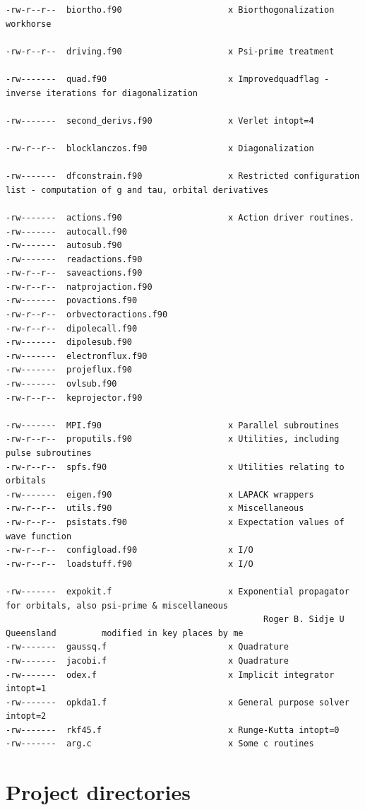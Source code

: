 \documentclass[10pt,leqno, oneside]{book}
\begin{document}
{\begin{verbatim}
-rw-r--r--  biortho.f90                     x Biorthogonalization workhorse

-rw-r--r--  driving.f90                     x Psi-prime treatment

-rw-------  quad.f90                        x Improvedquadflag - inverse iterations for diagonalization

-rw-------  second_derivs.f90               x Verlet intopt=4

-rw-r--r--  blocklanczos.f90                x Diagonalization

-rw-------  dfconstrain.f90                 x Restricted configuration list - computation of g and tau, orbital derivatives

-rw-------  actions.f90                     x Action driver routines.
-rw-------  autocall.f90
-rw-------  autosub.f90
-rw-------  readactions.f90
-rw-r--r--  saveactions.f90
-rw-r--r--  natprojaction.f90
-rw-------  povactions.f90
-rw-r--r--  orbvectoractions.f90
-rw-r--r--  dipolecall.f90
-rw-------  dipolesub.f90
-rw-------  electronflux.f90
-rw-------  projeflux.f90
-rw-------  ovlsub.f90
-rw-r--r--  keprojector.f90

-rw-------  MPI.f90                         x Parallel subroutines
-rw-r--r--  proputils.f90                   x Utilities, including pulse subroutines
-rw-r--r--  spfs.f90                        x Utilities relating to orbitals
-rw-------  eigen.f90                       x LAPACK wrappers
-rw-r--r--  utils.f90                       x Miscellaneous
-rw-r--r--  psistats.f90                    x Expectation values of wave function
-rw-r--r--  configload.f90                  x I/O
-rw-r--r--  loadstuff.f90                   x I/O

-rw-------  expokit.f                       x Exponential propagator for orbitals, also psi-prime & miscellaneous 
                                                   Roger B. Sidje U Queensland         modified in key places by me
-rw-------  gaussq.f                        x Quadrature
-rw-------  jacobi.f                        x Quadrature
-rw-------  odex.f                          x Implicit integrator intopt=1
-rw-------  opkda1.f                        x General purpose solver intopt=2
-rw-------  rkf45.f                         x Runge-Kutta intopt=0
-rw-------  arg.c                           x Some c routines
\end{verbatim}
}

\section{Project directories}
\end{document}
